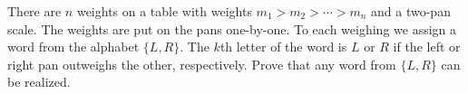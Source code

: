 There are $n$ weights on a table with weights $m_1 > m_2 > \cdots > m_n$ and a two-pan scale. The weights are put on the pans one-by-one. To each weighing we assign a word from the alphabet $\{L, R\}$. The $k$th letter of the word is $L$ or $R$ if the left or right pan outweighs the other, respectively. Prove that any word from $\{L, R\}$ can be realized.
